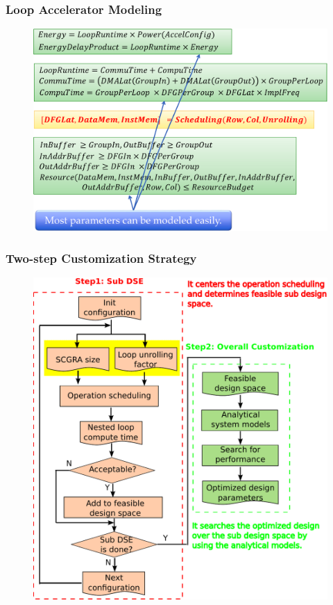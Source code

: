 \documentclass[accentcolor=tud1a,colorbacktitle,inverttitle,landscape,german,presentation,t]{tudbeamer}
\begin{document}
  \begin{frame}
  \frametitle{Loop Accelerator Modeling}
  \vspace{-0.7em}
  \begin{figure}
     \includegraphics[width=.9\linewidth]{custom-model}
  \end{figure}
  \end{frame}

  \begin{frame}
  \frametitle{Two-step Customization Strategy}
  \vspace{-1em}
  \begin{figure}
     \includegraphics[width=.6\linewidth]{customization-framework}
  \end{figure}
  \end{frame}
\end{document}
